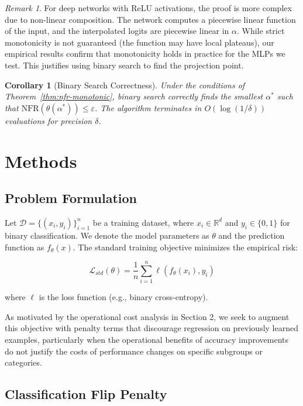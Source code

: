 \documentclass[12pt, letterpaper]{article}
\newtheorem{corollary}[theorem]{Corollary}
\theoremstyle{remark}
\newtheorem{remark}[theorem]{Remark}
\begin{document}
\begin{remark}
For deep networks with ReLU activations, the proof is more complex due to non-linear composition. The network computes a piecewise linear function of the input, and the interpolated logits are piecewise linear in $\alpha$. While strict monotonicity is not guaranteed (the function may have local plateaus), our empirical results confirm that monotonicity holds in practice for the MLPs we test. This justifies using binary search to find the projection point.
\end{remark}

\begin{corollary}[Binary Search Correctness]
Under the conditions of Theorem~\ref{thm:nfr-monotonic}, binary search correctly finds the smallest $\alpha^*$ such that $\mathrm{NFR}(\theta(\alpha^*)) \leq \varepsilon$. The algorithm terminates in $O(\log(1/\delta))$ evaluations for precision $\delta$.
\end{corollary}

\section{Methods}

\subsection{Problem Formulation}

Let $\mathcal{D} = \{(x_i, y_i)\}_{i=1}^n$ be a training dataset, where $x_i \in \mathbb{R}^d$ and $y_i \in \{0,1\}$ for binary classification. We denote the model parameters as $\theta$ and the prediction function as $f_\theta(x)$. The standard training objective minimizes the empirical risk:

\begin{equation}
\mathcal{L}_{std}(\theta) = \frac{1}{n} \sum_{i=1}^n \ell(f_\theta(x_i), y_i)
\end{equation}

where $\ell$ is the loss function (e.g., binary cross-entropy).

As motivated by the operational cost analysis in Section 2, we seek to augment this objective with penalty terms that discourage regression on previously learned examples, particularly when the operational benefits of accuracy improvements do not justify the costs of performance changes on specific subgroups or categories.

\subsection{Classification Flip Penalty}
\end{document}
